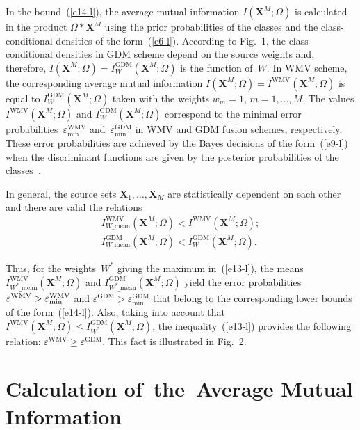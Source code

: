 \begin{multicols}{2}
In the bound~(\ref{e14-l}), the average mutual information 
$I(\mathbf{X}^M;\Omega)$ is calculated in the product 
$\Omega*\mathbf{X}^M$ using the prior probabilities of the classes and the 
class-conditional densities of the form~(\ref{e6-l}). According to Fig.~1,  
the class-conditional densities in GDM scheme depend on the source weights and, 
therefore, $I(\mathbf{X}^M;\Omega)=I_W^{\mathrm{GDM}}(\mathbf{X}^M;\Omega)$ is 
the function of~$W$. In WMV scheme, the corresponding average mutual 
information $I(\mathbf{X}^M;\Omega)=I^{\mathrm{WMV}}(\mathbf{X}^M;\Omega)$ is 
equal to $I_W^{\mathrm{GDM}}(\mathbf{X}^M;\Omega)$ taken with the weights 
$w_m=1$, $m=1,\ldots , M$. The values $I^{\mathrm{WMV}}(\mathbf{X}^M;\Omega)$ 
and $I_W^{\mathrm{GDM}}(\mathbf{X}^M;\Omega)$ correspond to the minimal error 
probabilities~$\varepsilon_{\min}^{\mathrm{WMV}}$ and~$\varepsilon_{\min}^{\mathrm{GDM}}$ 
in WMV and GDM fusion schemes, respectively.  These error probabilities are 
achieved by the Bayes decisions of the form~(\ref{e9-l}) when the discriminant 
functions are given by the posterior probabilities of the classes~\cite{10-l}.


In general, the source sets $\mathbf{X}_1,\ldots, \mathbf{X}_M$ are statistically 
dependent on each other and there are valid the relations 
\begin{gather*}
I^{\mathrm{WMV}}_{W\_\mathrm{mean}} 
(\mathbf{X}^M;\Omega) < I^{\mathrm{WMV}}(\mathbf{X}^M;\Omega);\\[6pt]
I_{W\_\mathrm{mean}}^{\mathrm{GDM}} (\mathbf{X}^M;\Omega) 
< I^{\mathrm{GDM}}_{W} 
(\mathbf{X}^M;\Omega).
\end{gather*}

 Thus, for the weights~$W^*$ giving the maximum 
in~(\ref{e13-l}), the means $I^{\mathrm{WMV}}_{W^*\_\mathrm{mean}} 
(\mathbf{X}^M;\Omega)$ 
and $I^{\mathrm{GDM}}_{W^*\_\mathrm{mean}}(\mathbf{X}^M;\Omega)$ yield the error 
probabilities $\varepsilon^{\mathrm{WMV}}\linebreak
>\varepsilon^{\mathrm{WMV}}_{\min}$ and 
$\varepsilon^{\mathrm{GDM}}>\varepsilon^{\mathrm{GDM}}_{\min}$ that belong to the 
corresponding lower bounds of the form~(\ref{e14-l}). Also, taking into account 
that $I^{\mathrm{WMV}}(\mathbf{X}^M;\Omega)\leq 
I^{\mathrm{GDM}}_{W^*}(\mathbf{X}^M;\Omega)$, the inequality~(\ref{e13-l}) 
provides the following relation: $\varepsilon^{\mathrm{WMV}}
\geq \varepsilon^{\mathrm{GDM}}$. 
This fact is illustrated  in Fig.~2. 

\section{Calculation of~the~Average Mutual Information}


\end{multicols}

